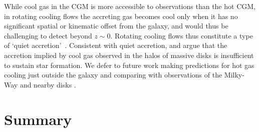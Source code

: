 \documentclass[fleqn,usenatbib]{mnras}
\begin{document}
While cool gas in the CGM is more accessible to observations than the hot CGM, in rotating cooling flows the accreting gas becomes cool only when it has no significant spatial or kinematic offset from the galaxy, and would thus be challenging to detect beyond $z\sim0$.
Rotating cooling flows thus constitute a type of `quiet accretion'~\citep{Putman2012}. 
Consistent with quiet accretion, \cite{Sancisi2008} and \cite{Binney2009} argue that the accretion implied by cool gas observed in the halos of massive disks is insufficient to sustain star formation.
We defer to future work making predictions for hot gas cooling just outside the galaxy and comparing with observations of the Milky-Way and nearby disks \citep[e.g.,][]{Zheng2017}. 




\section{Summary}
\label{s: conclusions}
\end{document}
